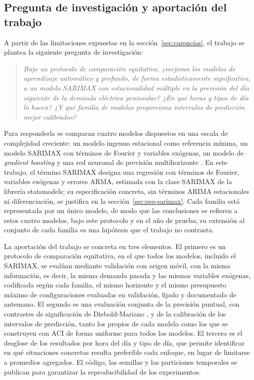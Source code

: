 \subsection{Pregunta de investigación y aportación del trabajo}\label{sec:aportacion}

A partir de las limitaciones expuestas en la sección~\ref{sec:carencias}, el
trabajo se plantea la siguiente pregunta de investigación:

\begin{quote}
\itshape
Bajo un protocolo de comparación equitativo, ¿mejoran los modelos de
aprendizaje automático y profundo, de forma estadísticamente significativa, a
un modelo SARIMAX con estacionalidad múltiple en la previsión del día
siguiente de la demanda eléctrica peninsular? ¿En qué horas y tipos de día lo
hacen? ¿Y qué familia de modelos proporciona intervalos de predicción mejor
calibrados?
\end{quote}

Para responderla se comparan cuatro modelos dispuestos en una escala de
complejidad creciente: un modelo ingenuo estacional como referencia mínima, un
modelo SARIMAX con términos de Fourier y variables exógenas, un modelo de
\textit{gradient boosting} \parencite[LightGBM;][]{ke2017lightgbm} y una red
neuronal de previsión multihorizonte \parencite[N-HiTS;][]{challu2023nhits}.
En este trabajo, el término SARIMAX designa una regresión con términos de
Fourier, variables exógenas y errores ARMA, estimada con la clase SARIMAX de
la librería statsmodels; su especificación concreta, sin términos ARIMA
estacionales ni diferenciación, se justifica en la
sección~\ref{sec:esp-sarimax}. Cada familia está representada por un único
modelo, de modo que las conclusiones se refieren a estos cuatro modelos, bajo
este protocolo y en el año de prueba; su extensión al conjunto de cada
familia es una hipótesis que el trabajo no contrasta.

La aportación del trabajo se concreta en tres
elementos. El primero es un protocolo de comparación equitativa, en el que
todos los modelos, incluido el SARIMAX, se evalúan mediante validación con
origen móvil, con la misma información, es decir, la misma demanda pasada y
las mismas variables exógenas, codificada según cada familia, el mismo
horizonte y el mismo presupuesto máximo de configuraciones evaluadas en
validación, fijado y documentado de antemano. El segundo
es una evaluación conjunta de la precisión puntual, con contrastes de
significación de Diebold-Mariano \parencite{diebold1995comparing}, y de la calibración de los intervalos de
predicción, tanto los propios de cada modelo como los que se construyen con
ACI de forma uniforme para todos los modelos. El tercero es el desglose de los resultados por hora del
día y tipo de día, que permite identificar en qué situaciones concretas
resulta preferible cada enfoque, en lugar de limitarse a promedios agregados.
El código, las semillas y las particiones temporales se publican para
garantizar la reproducibilidad de los experimentos.


